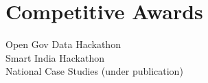 \documentclass[]{deedy-resume-reversed}
\begin{document}
\begin{minipage}[t]{0.33\textwidth}

\section{Competitive Awards}
Open Gov Data Hackathon\\
Smart India Hackathon\\
National Case Studies (under publication)\\

\sectionsep



\end{minipage}
\end{document}
